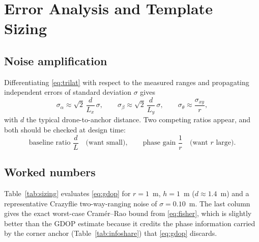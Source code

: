 \documentclass[11pt,a4paper]{article}
\begin{document}
\section{Error Analysis and Template Sizing}
\label{sec:design}

\subsection{Noise amplification}

Differentiating \eqref{eq:trilat} with respect to the measured ranges and
propagating independent errors of standard deviation $\sigma$ gives
\begin{equation}
\sigma_\alpha \approx \sqrt2\,\frac{d}{L_x}\,\sigma,
\qquad
\sigma_\beta \approx \sqrt2\,\frac{d}{L_y}\,\sigma,
\qquad
\sigma_\theta \approx \frac{\sigma_{xy}}{r},
\label{eq:gdop}
\end{equation}
with $d$ the typical drone-to-anchor distance. Two competing ratios appear, and
both should be checked at design time:
\begin{equation}
\text{baseline ratio } \frac{d}{L} \quad\text{(want small)},
\qquad
\text{phase gain } \frac{1}{r} \quad\text{(want $r$ large)} .
\end{equation}

\begin{center}
\end{center}

\subsection{Worked numbers}

Table~\ref{tab:sizing} evaluates \eqref{eq:gdop} for $r=1$~m, $h=1$~m
($d\approx1.4$~m) and a representative Crazyflie two-way-ranging noise of
$\sigma = 0.10$~m. The last column gives the exact worst-case Cram\'er--Rao
bound from \eqref{eq:fisher}, which is slightly better than the GDOP estimate
because it credits the phase information carried by the corner anchor
(Table~\ref{tab:infoshare}) that \eqref{eq:gdop} discards.
\end{document}
